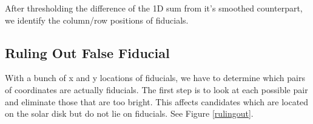 \documentclass[10pt]{scrartcl}
\begin{document}
After thresholding the difference of the 1D sum from it's smoothed counterpart, we identify the column/row positions of fiducials. 

\subsection{Ruling Out False Fiducial} %
\label{sub:ruling_out_false_fiducial}

With a bunch of x and y locations of fiducials, we have to determine which pairs of coordinates are actually fiducials. The first step is to look at each possible pair and eliminate those that are too bright. This affects candidates which are located on the solar disk but do not lie on fiducials. See Figure \ref{rulingout}.


\begin{figure}[!ht]
\end{figure}
\end{document}
